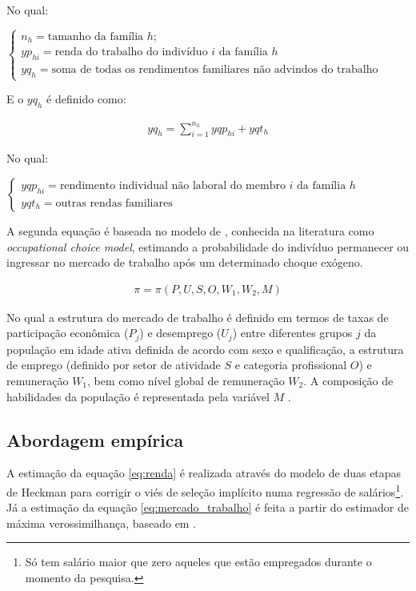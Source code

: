 No qual:

\vspace{0.5cm}

$
\begin{cases}
	n_h     = \text{tamanho da família $h$;} \\
	yp_{hi} = \text{renda do trabalho do indivíduo $i$ da família $h$} \\
	yq_h    = \text{soma de todas os rendimentos familiares não advindos do trabalho}
\end{cases}
$

\vspace{0.5cm}

E o $yq_h$ é definido como:

\begin{align}
	yq_h = \sum_{i = 1}^{n_h} yqp_{hi} + yqt_h 
\end{align}

No qual:

\vspace{0.5cm}

$
\begin{cases}
	yqp_{hi} = \text{rendimento individual não laboral do membro $i$ da família $h$} \\
	yqt_h    = \text{outras rendas familiares}
\end{cases}
$

\vspace{0.5cm}

A segunda equação é baseada no modelo de \textcite{ganuza02}, conhecida na literatura como \textit{occupational choice model}, estimando a probabilidade do indivíduo permanecer ou ingressar no mercado de trabalho após um determinado choque exógeno.

\begin{align}
	\pi = \pi \left( P, U, S, O, W_1, W_2, M \right) \label{eq:mercado_trabalho}
\end{align}

No qual a estrutura do mercado de trabalho é definido em termos de taxas de participação econômica ($P_j$) e desemprego ($U_j$) entre diferentes grupos $j$ da população em idade ativa definida de acordo com sexo e qualificação, a estrutura de emprego (definido por setor de atividade $S$ e categoria profissional $O$) e remuneração $W_1$, bem como nível global de remuneração $W_2$. A composição de habilidades da população é representada pela variável $M$ \cite{ganuza07}.

\subsection{Abordagem empírica} \label{abordagem_empirica}

A estimação da equação \ref{eq:renda} é realizada através do modelo de duas etapas de Heckman \cite{heckman79} para corrigir o viés de seleção implícito numa regressão de salários\footnote{Só tem salário maior que zero aqueles que estão empregados durante o momento da pesquisa.}. Já a estimação da equação \ref{eq:mercado_trabalho} é feita a partir do estimador de máxima verossimilhança, baseado em \textcite{colombo08}.


